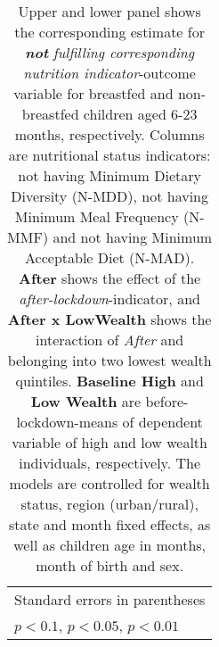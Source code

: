 \begin{table}[htbp]
\begin{tabular}{l*{3}{c}}
\hline\hline \multicolumn{4}{l}{\footnotesize Standard errors in parentheses}\\ \multicolumn{4}{l}{\footnotesize \sym{*} \(p<0.1\), \sym{**} \(p<0.05\), \sym{***} \(p<0.01\)}\\ \end{tabular} \\ \caption*{\footnotesize Upper and lower panel shows the corresponding estimate for \textit{\textbf{not} fulfilling corresponding nutrition indicator}-outcome variable for breastfed and non-breastfed children aged 6-23 months, respectively. Columns are nutritional status indicators: not having Minimum Dietary Diversity (N-MDD), not having Minimum Meal Frequency (N-MMF) and not having Minimum Acceptable Diet (N-MAD). \textbf{After} shows the effect of the \textit{after-lockdown}-indicator, and \textbf{After x LowWealth} shows the interaction of \textit{After} and belonging into two lowest wealth quintiles. \textbf{Baseline High} and \textbf{Low Wealth} are before-lockdown-means of dependent variable of high and low wealth individuals, respectively. The models are controlled for wealth status, region (urban/rural), state and month fixed effects, as well as children age in months, month of birth and sex.} \end{table}
